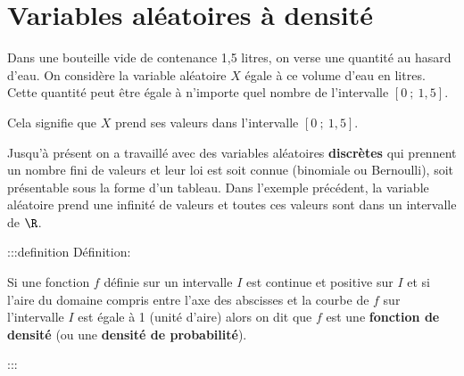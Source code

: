 \documentclass{cornouaille}
\begin{document}

\tableofcontents

\section{{Variables aléatoires à densité}{}}



\begin{exemple}
Dans une bouteille vide de contenance 1,5 litres, on verse
une quantité au hasard d'eau. On considère la variable aléatoire $X$
égale à ce volume d'eau en litres. Cette quantité peut être égale à
n'importe quel nombre de l'intervalle
$\left[0\ ;\ 1,5 \right]$.

Cela signifie que $X$ prend ses valeurs dans l'intervalle $\left[0\ ;\ 1,5 \right]$.
\end{exemple}



\begin{remarque}
Jusqu'à présent on a travaillé avec des variables aléatoires \textbf{discrètes} qui prennent un nombre fini de valeurs et leur loi est soit connue (binomiale ou Bernoulli), soit présentable sous la forme d'un tableau. Dans l'exemple précédent, la variable aléatoire prend une infinité de valeurs et toutes ces valeurs sont dans un intervalle de $\R$.
\end{remarque}




:::definition Définition: 


Si une fonction $f$ définie sur un intervalle $I$ est continue et
positive sur $I$ et si l'aire du domaine compris entre l'axe des
abscisses et la courbe de $f$ sur l'intervalle $I$ est égale à 1
(unité d'aire) alors on dit que $f$ est une \textbf{fonction
de densité}{} (ou une \textbf{densité de probabilité}{}).


:::
\end{document}
